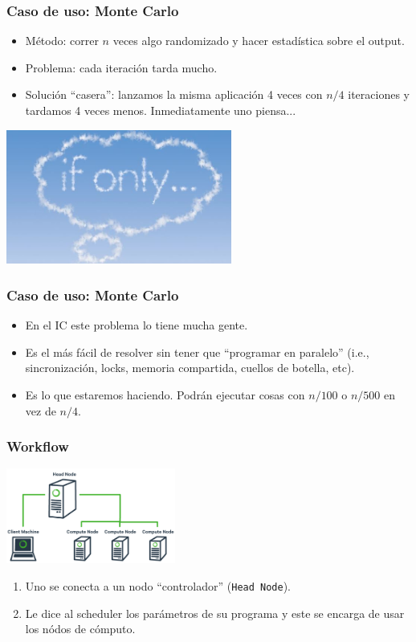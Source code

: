 \documentclass[]{beamer}
\begin{document}
\begin{frame}
\frametitle{Caso de uso: Monte Carlo}
\begin{itemize}
  \item<+-> Método: correr $n$ veces algo randomizado y hacer estadística sobre el output.
  \item<+-> Problema: cada iteración tarda mucho.
  \item<+-> Solución ``casera'': lanzamos la misma aplicación 4 veces con $n/4$ iteraciones y tardamos 4 veces menos. Inmediatamente uno piensa...
\end{itemize}
\onslide<+->
\begin{center}
\includegraphics[width=20em]{ifonly.jpg}
\end{center}
\end{frame}

\begin{frame}
\frametitle{Caso de uso: Monte Carlo}
\begin{itemize}
  \item En el IC este problema lo tiene mucha gente.
  \item Es el más fácil de resolver sin tener que ``programar en paralelo'' (i.e., sincronización, locks, memoria compartida, cuellos de botella, etc).
  \item Es lo que estaremos haciendo. Podrán ejecutar cosas con $n/100$ o $n/500$ en vez de $n/4$. 
\end{itemize}
\end{frame}


\begin{frame}
\frametitle{Workflow}
\begin{center}
\includegraphics[width=15em]{cluster_diagram.png}
\end{center}
\begin{enumerate}
  \item Uno se conecta a un nodo ``controlador'' (\Verb=Head Node=).
  \item Le dice al scheduler los parámetros de su programa y este se encarga de usar los nódos de cómputo.
\end{enumerate}
\end{frame}
\end{document}

